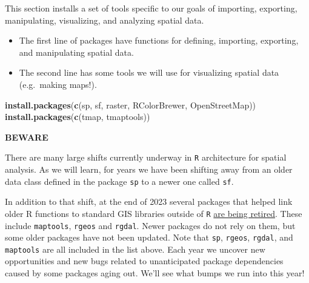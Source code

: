 \documentclass[
]{book}
\newenvironment{Shaded}{\begin{snugshade}}{\end{snugshade}}
\newcommand{\FunctionTok}[1]{\textcolor[rgb]{0.13,0.29,0.53}{\textbf{#1}}}
\newcommand{\NormalTok}[1]{#1}
\newcommand{\StringTok}[1]{\textcolor[rgb]{0.31,0.60,0.02}{#1}}
\providecommand{\tightlist}{%
  \setlength{\itemsep}{0pt}\setlength{\parskip}{0pt}}
\newenvironment{rmdcaution}[1]
  {
  \begin{itemize}
  \renewcommand{\labelitemi}{
    \raisebox{-.7\height}[0pt][0pt]{
      {\setkeys{Gin}{width=3em,keepaspectratio}\texttt{[image: images/\#1]}}
    }
  }
  \setlength{\fboxsep}{1em}
  \begin{caution}
  \item
  }
  {
  \end{caution}
  \end{itemize}
  }
\begin{document}
This section installs a set of tools specific to our goals of importing, exporting, manipulating, visualizing, and analyzing spatial data.

\begin{itemize}
\tightlist
\item
  The first line of packages have functions for defining, importing, exporting, and manipulating spatial data.
\item
  The second line has some tools we will use for visualizing spatial data (e.g.~making maps!).
\end{itemize}

\begin{Shaded}
\begin{Highlighting}[]
\FunctionTok{install.packages}\NormalTok{(}\FunctionTok{c}\NormalTok{(}\StringTok{\textquotesingle{}sp\textquotesingle{}}\NormalTok{, }\StringTok{\textquotesingle{}sf\textquotesingle{}}\NormalTok{, }\StringTok{\textquotesingle{}raster\textquotesingle{}}\NormalTok{, }\StringTok{\textquotesingle{}RColorBrewer\textquotesingle{}}\NormalTok{, }\StringTok{\textquotesingle{}OpenStreetMap\textquotesingle{}}\NormalTok{))  }
\FunctionTok{install.packages}\NormalTok{(}\FunctionTok{c}\NormalTok{(}\StringTok{\textquotesingle{}tmap\textquotesingle{}}\NormalTok{, }\StringTok{\textquotesingle{}tmaptools\textquotesingle{}}\NormalTok{)) }
\end{Highlighting}
\end{Shaded}

\begin{rmdcaution}{caution}
\textbf{BEWARE}

There are many large shifts currently underway in \texttt{R} architecture for spatial analysis. As we will learn, for years we have been shifting away from an older data class defined in the package \texttt{sp} to a newer one called \texttt{sf}.

In addition to that shift, at the end of 2023 several packages that helped link older R functions to standard GIS libraries outside of \texttt{R} \href{https://r-spatial.org/r/2022/04/12/evolution.html}{are being retired}. These include \texttt{maptools}, \texttt{rgeos} and \texttt{rgdal}. Newer packages do not rely on them, but some older packages have not been updated. Note that \texttt{sp}, \texttt{rgeos}, \texttt{rgdal}, and \texttt{maptools} are all included in the list above. Each year we uncover new opportunities and new bugs related to unanticipated package dependencies caused by some packages aging out. We'll see what bumps we run into this year!

\end{rmdcaution}
\end{document}
